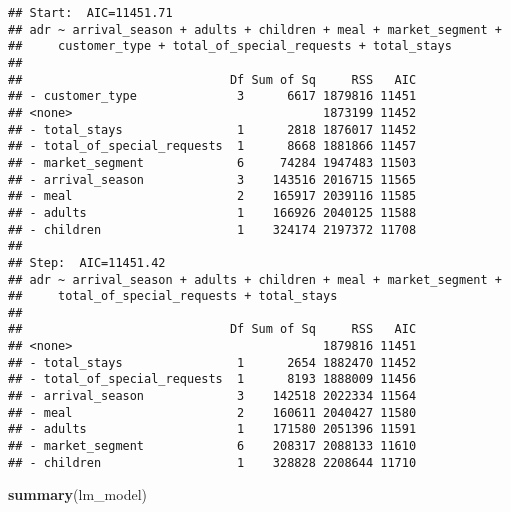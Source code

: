 \documentclass[]{article}
\newenvironment{Shaded}{\begin{snugshade}}{\end{snugshade}}
\newcommand{\KeywordTok}[1]{\textcolor[rgb]{0.13,0.29,0.53}{\textbf{#1}}}
\newcommand{\NormalTok}[1]{#1}
\begin{document}
\begin{verbatim}
## Start:  AIC=11451.71
## adr ~ arrival_season + adults + children + meal + market_segment + 
##     customer_type + total_of_special_requests + total_stays
## 
##                             Df Sum of Sq     RSS   AIC
## - customer_type              3      6617 1879816 11451
## <none>                                   1873199 11452
## - total_stays                1      2818 1876017 11452
## - total_of_special_requests  1      8668 1881866 11457
## - market_segment             6     74284 1947483 11503
## - arrival_season             3    143516 2016715 11565
## - meal                       2    165917 2039116 11585
## - adults                     1    166926 2040125 11588
## - children                   1    324174 2197372 11708
## 
## Step:  AIC=11451.42
## adr ~ arrival_season + adults + children + meal + market_segment + 
##     total_of_special_requests + total_stays
## 
##                             Df Sum of Sq     RSS   AIC
## <none>                                   1879816 11451
## - total_stays                1      2654 1882470 11452
## - total_of_special_requests  1      8193 1888009 11456
## - arrival_season             3    142518 2022334 11564
## - meal                       2    160611 2040427 11580
## - adults                     1    171580 2051396 11591
## - market_segment             6    208317 2088133 11610
## - children                   1    328828 2208644 11710
\end{verbatim}

\begin{Shaded}
\begin{Highlighting}[]
\KeywordTok{summary}\NormalTok{(lm_model)}
\end{Highlighting}
\end{Shaded}
\end{document}
